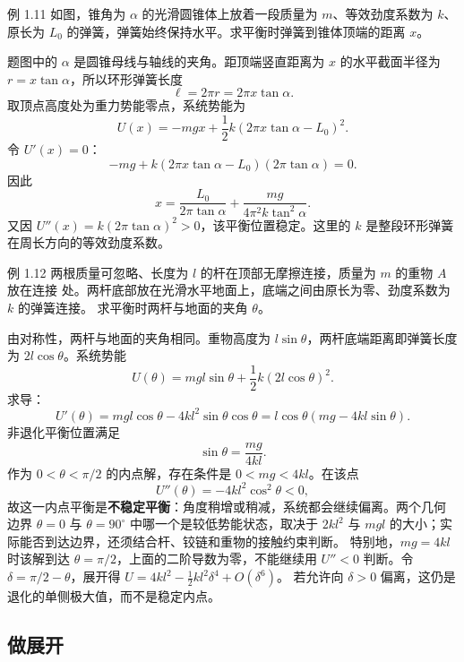 \Needspace{0.36\textheight}
\begin{origexamplebox}{例 1.11}
如图，锥角为 $\alpha$ 的光滑圆锥体上放着一段质量为 $m$、等效劲度系数为 $k$、原长为
$L_0$ 的弹簧，弹簧始终保持水平。求平衡时弹簧到锥体顶端的距离 $x$。
\probdiagOneEleven
\end{origexamplebox}

\begin{xesolution}
题图中的 $\alpha$ 是圆锥母线与轴线的夹角。距顶端竖直距离为 $x$ 的水平截面半径为
$r=x\tan\alpha$，所以环形弹簧长度
\[
 \ell=2\pi r=2\pi x\tan\alpha.
\]
取顶点高度处为重力势能零点，系统势能为
\[
 U(x)=-mgx+\frac12k(2\pi x\tan\alpha-L_0)^2.
\]
令 $U'(x)=0$：
\[
 -mg+k(2\pi x\tan\alpha-L_0)(2\pi\tan\alpha)=0.
\]
因此
\[
 \boxed{x=\frac{L_0}{2\pi\tan\alpha}
 +\frac{mg}{4\pi^2k\tan^2\alpha}}.
\]
又因
$U''(x)=k(2\pi\tan\alpha)^2>0$，该平衡位置稳定。这里的 $k$ 是整段环形弹簧在周长方向的等效劲度系数。
\end{xesolution}

\Needspace{0.37\textheight}
\begin{origexamplebox}{例 1.12}
两根质量可忽略、长度为 $l$ 的杆在顶部无摩擦连接，质量为 $m$ 的重物 $A$ 放在连接
处。两杆底部放在光滑水平地面上，底端之间由原长为零、劲度系数为 $k$ 的弹簧连接。
求平衡时两杆与地面的夹角 $\theta$。
\probdiagOneTwelve
\end{origexamplebox}

\begin{xesolution}
由对称性，两杆与地面的夹角相同。重物高度为 $l\sin\theta$，两杆底端距离即弹簧长度为
$2l\cos\theta$。系统势能
\[
 U(\theta)=mgl\sin\theta+\frac12k(2l\cos\theta)^2.
\]
求导：
\[
 U'(\theta)=mgl\cos\theta-4kl^2\sin\theta\cos\theta
 =l\cos\theta(mg-4kl\sin\theta).
\]
非退化平衡位置满足
\[
 \boxed{\sin\theta=\frac{mg}{4kl}}.
\]
作为 $0<\theta<\pi/2$ 的内点解，存在条件是 $0<mg<4kl$。在该点
\[
 U''(\theta)=-4kl^2\cos^2\theta<0,
\]
故这一内点平衡是\textbf{不稳定平衡}：角度稍增或稍减，系统都会继续偏离。两个几何
边界 $\theta=0$ 与 $\theta=90^\circ$ 中哪一个是较低势能状态，取决于 $2kl^2$ 与
$mgl$ 的大小；实际能否到达边界，还须结合杆、铰链和重物的接触约束判断。
特别地，$mg=4kl$ 时该解到达 $\theta=\pi/2$，上面的二阶导数为零，不能继续用
$U''<0$ 判断。令 $\delta=\pi/2-\theta$，展开得
$U=4kl^2-\tfrac12kl^2\delta^4+O(\delta^6)$。
若允许向 $\delta>0$ 偏离，这仍是退化的单侧极大值，而不是稳定内点。
\end{xesolution}

\subsection{做展开}

